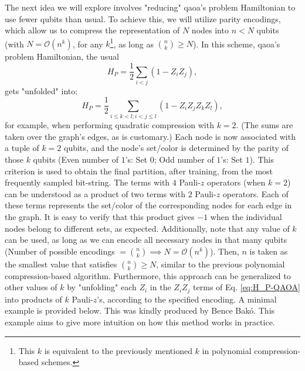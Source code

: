 The next idea we will explore involves "reducing" \acrshort{qaoa}'s problem Hamiltonian to use fewer qubits than usual. To achieve this, we will utilize parity encodings, which allow us to compress the representation of \(N\) nodes into \(n < N\) qubits (with \(N = \mathcal{O}(n^k)\), for any \(k\)\footnote{This $k$ is equivalent to the previously mentioned $k$ in polynomial compression-based schemes.}, as long as \(\binom{n}{k} \geq N\)). In this scheme, \acrshort{qaoa}'s problem Hamiltonian, the usual
\begin{equation}\label{eq:H_P-QAOA}
    H_P = \frac{1}{2}\sum\limits_{i<j}(1-Z_iZ_j),
\end{equation}
gets "unfolded" into:
\begin{equation}\label{eq:H_P-QAOA-k=2}
    H_P = \frac{1}{2}\sum\limits_{i \leq k<l;i<j \leq l}(1-Z_iZ_jZ_kZ_l),
\end{equation}
for example, when performing quadratic compression with \(k = 2\). (The sums are taken over the graph's edges, as is customary.) Each node is now associated with a tuple of \(k = 2\) qubits, and the node's set/color is determined by the parity of those \(k\) qubits (Even number of $1$'s: Set $0$; Odd number of $1$'s: Set $1$). This criterion is used to obtain the final partition, after training, from the most frequently sampled bit-string. The terms with $4$ Pauli-$z$ operators (when \(k = 2\)) can be understood as a product of two terms with $2$ Pauli-$z$ operators. Each of these terms represents the set/color of the corresponding nodes for each edge in the graph. It is easy to verify that this product gives $-1$ when the individual nodes belong to different sets, as expected. Additionally, note that any value of \(k\) can be used, as long as we can encode all necessary nodes in that many qubits (Number of possible encodings \(= \binom{n}{k} \implies N = \mathcal{O}(n^k)\)). Then, \(n\) is taken as the smallest value that satisfies \(\binom{n}{k} \geq N\), similar to the previous polynomial compression-based algorithm. Furthermore, this approach can be generalized to other values of \(k\) by "unfolding" each \(Z_i\) in the \(Z_i Z_j\) terms of Eq. \ref{eq:H_P-QAOA} into products of \(k\) Pauli-$z$'s, according to the specified encoding. A minimal example is provided below. This was kindly produced by Bence Bakó. This example aims to give more intuition on how this method works in practice.

